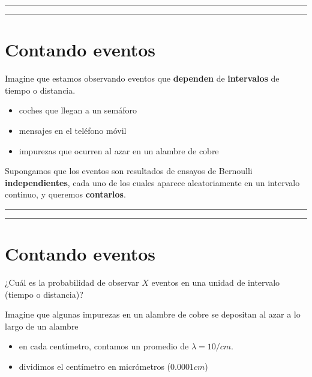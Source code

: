 \documentclass[
]{book}
\providecommand{\tightlist}{%
  \setlength{\itemsep}{0pt}\setlength{\parskip}{0pt}}
\begin{document}
\begin{center}\rule{0.5\linewidth}{0.5pt}\end{center}

\begin{center}\rule{0.5\linewidth}{0.5pt}\end{center}

\hypertarget{contando-eventos}{%
\section{Contando eventos}\label{contando-eventos}}

Imagine que estamos observando eventos que \textbf{dependen} de \textbf{intervalos} de tiempo o distancia.

\begin{itemize}
\tightlist
\item
  coches que llegan a un semáforo
\item
  mensajes en el teléfono móvil
\item
  impurezas que ocurren al azar en un alambre de cobre
\end{itemize}

Supongamos que los eventos son resultados de ensayos de Bernoulli \textbf{independientes}, cada uno de los cuales aparece aleatoriamente en un intervalo continuo, y queremos \textbf{contarlos}.

\begin{center}\rule{0.5\linewidth}{0.5pt}\end{center}

\begin{center}\rule{0.5\linewidth}{0.5pt}\end{center}

\hypertarget{contando-eventos-1}{%
\section{Contando eventos}\label{contando-eventos-1}}

¿Cuál es la probabilidad de observar \(X\) eventos en una unidad de intervalo (tiempo o distancia)?

Imagine que algunas impurezas en un alambre de cobre se depositan al azar a lo largo de un alambre

\begin{itemize}
\tightlist
\item
  en cada centímetro, contamos un promedio de \(\lambda=10/cm\).
\item
  dividimos el centímetro en micrómetros (\(0.0001cm\))
\end{itemize}
\end{document}
